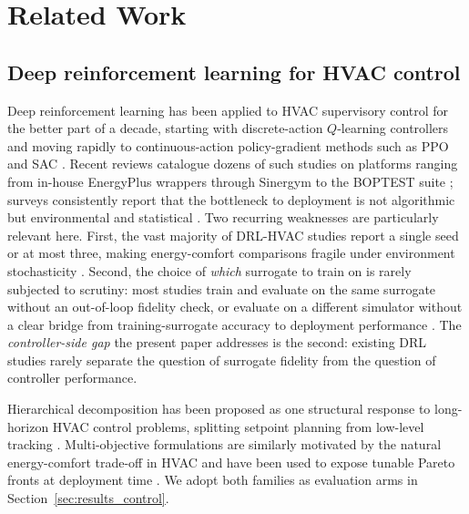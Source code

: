 \section{Related Work}
\label{sec:related_work}

\subsection{Deep reinforcement learning for HVAC control}
\label{ssec:rw_drl}

Deep reinforcement learning has been applied to HVAC supervisory
control for the better part of a decade, starting with discrete-action
$Q$-learning controllers \citep{Wei2017DeepRL,Mnih2015Atari} and
moving rapidly to continuous-action policy-gradient methods such as
PPO and SAC \citep{Schulman2017PPO,Haarnoja2018SAC}. Recent reviews
catalogue dozens of such studies on platforms ranging from in-house
EnergyPlus wrappers through Sinergym \citep{Sinergym2021} to the
BOPTEST suite \citep{Blum2021BOPTEST}; surveys consistently report
that the bottleneck to deployment is not algorithmic but environmental
and statistical \citep{Mason2019RLReview,AlSayed2024Deployment}. Two
recurring weaknesses are particularly relevant here. First, the vast
majority of DRL-HVAC studies report a single seed or at most three,
making energy-comfort comparisons fragile under environment
stochasticity \citep{Henderson2018Reproducibility,Agarwal2021RLPrecipice,
Hedayat2025FiftySeed}. Second, the choice of \emph{which} surrogate to
train on is rarely subjected to scrutiny: most studies train and
evaluate on the same surrogate without an out-of-loop fidelity check,
or evaluate on a different simulator without a clear bridge from
training-surrogate accuracy to deployment performance
\citep{Zhang2019WholeBuilding,Chen2018OptimalContext}. The
\emph{controller-side gap} the present paper addresses is the second:
existing DRL studies rarely separate the question of surrogate fidelity
from the question of controller performance.

Hierarchical decomposition has been proposed as one structural response
to long-horizon HVAC control problems, splitting setpoint planning
from low-level tracking
\citep{Bacon2017Options,Nachum2018HIRO,Liao2025HDRL}. Multi-objective
formulations \citep{Roijers2013MOSurvey,Yang2019MORL,Hayes2022MOSurvey}
are similarly motivated by the natural energy-comfort trade-off in
HVAC and have been used to expose tunable Pareto fronts at deployment
time \citep{Gao2024PredictiveFeatures,Sun2024StateHistory}. We adopt
both families as evaluation arms in Section~\ref{sec:results_control}.


